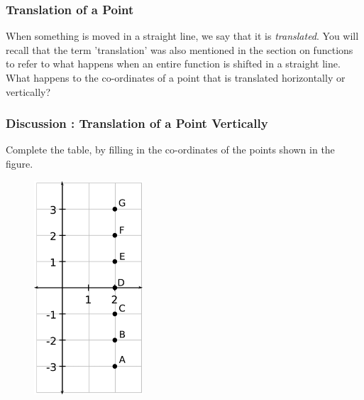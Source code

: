             \subsubsection{ Translation of a Point}
            \nopagebreak
            
        
        \label{m39358*id70123}When something is moved in a straight line, we say that it is \textsl{translated}. You will recall that the term 'translation' was also mentioned in the section on functions to refer to what happens when an entire function is shifted in a straight line. What happens to the co-ordinates of a point that is translated horizontally or vertically?\par 
\label{m39358*secfhsst!!!underscore!!!id2414}
            \subsubsection{  Discussion : Translation of a Point Vertically }
            \nopagebreak
            
        \label{m39358*id70140}Complete the table, by filling in the co-ordinates of the points shown in the figure.\par 
        \label{m39358*id70146}
          
    \setcounter{subfigure}{0}


	\begin{figure}[H] %
    \begin{center}
    \label{m39358*id70150!!!underscore!!!media}\label{m39358*id70150!!!underscore!!!printimage}\includegraphics[height=300px]{col11306.imgs/m39358_MG10C14_022.png} %
        
      \vspace{2pt}
    \vspace{.1in}
    
    \end{center}

 \end{figure}   

